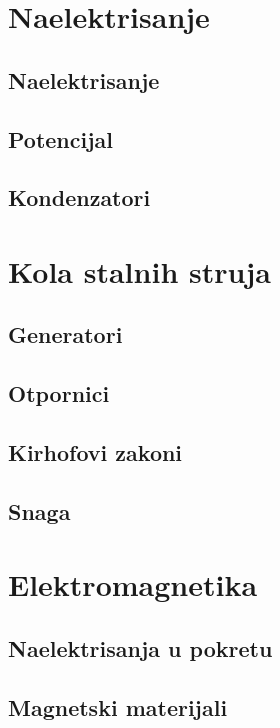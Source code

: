 \section{Naelektrisanje}

\subsection{Naelektrisanje}

\subsection{Potencijal}

\subsection{Kondenzatori}

\section{Kola stalnih struja}

\subsection{Generatori}

\subsection{Otpornici}

\subsection{Kirhofovi zakoni}

\subsection{Snaga}

\section{Elektromagnetika}

\subsection{Naelektrisanja u pokretu}

\subsection{Magnetski materijali}

